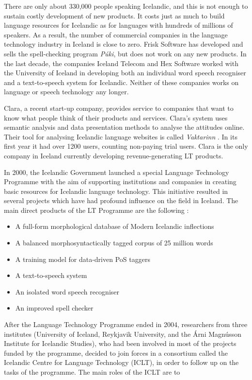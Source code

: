 \begin{multicols}{2}
There are only about 330,000 people speaking Icelandic, and this is not enough to sustain costly development of new products. It costs just as much to build language resources for Icelandic as for languages with hundreds of millions of speakers. As a result, the number of commercial companies in the language technology industry in Iceland is close to zero. Frisk Software has developed and sells the spell-checking program \textit{Púki}, but does not work on any new products. In the last decade, the companies Iceland Telecom and Hex Software worked with the University of Iceland in developing both an individual word speech recogniser and a text-to-speech system for Icelandic. Neither of these companies works on language or speech technology any longer.

Clara, a recent start-up company, provides service to companies that want to know what people think of their products and services. Clara’s system uses semantic analysis and data presentation methods to analyse the attitudes online. Their tool for analysing Icelandic language websites is called \textit{Vaktarinn} \cite{vak1}.  In its first year it had over 1200 users, counting non-paying trial users. Clara is the only company in Iceland currently developing revenue-generating LT products.

In 2000, the Icelandic Government launched a special Language Technology Programme with the aim of supporting institutions and companies in creating basic resources for Icelandic language technology. This initiative resulted in several projects which have had profound influence on the field in Iceland. The main direct products of the LT Programme are the following \cite{ilrt1}: 

\begin{itemize}
\item A full-form morphological database of Modern Icelandic inflections
\item A balanced morphosyntactically tagged corpus of 25 million words
\item A training model for data-driven PoS taggers
\item A text-to-speech system
\item An isolated word speech recogniser
\item An improved spell checker
\end{itemize}

After the Language Technology Programme ended in 2004, researchers from three institutes (University of Iceland, Reykjavik University, and the Árni Magnússon Institute for Icelandic Studies), who had been involved in most of the projects funded by the programme, decided to join forces in a consortium called the Icelandic Centre for Language Technology (ICLT), in order to follow up on the tasks of the programme. The main roles of the ICLT are to


\end{multicols}
